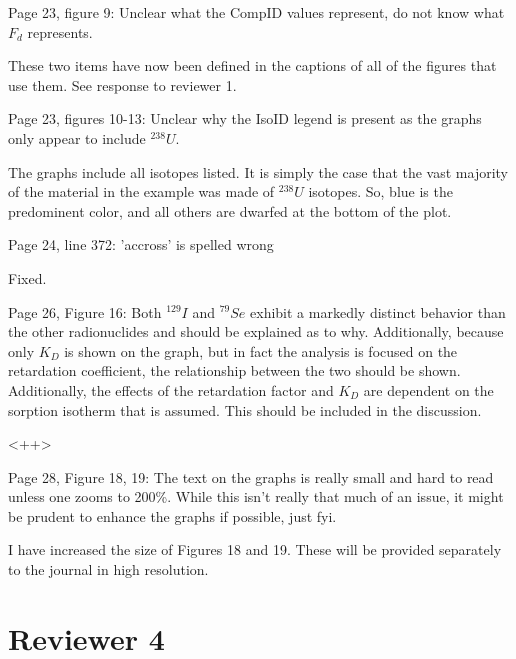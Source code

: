 \documentclass[answers,12pt]{exam}
\begin{document}
\begin{questions}
\question 
Page 23, figure 9: Unclear what the CompID values represent, do not know what $F_d$ represents. 
\begin{solution}
These two items have now been defined in the captions of all of the figures 
        that use them. See response to reviewer 1. 
\end{solution} 
 
\question Page  23,  figures  10-13:  Unclear  why  the  IsoID  legend  is  
present  as  the  graphs  only  appear  to  include  $^{238} U$. 
\begin{solution}
The graphs include all isotopes listed. It is simply the case that the vast 
        majority of the material in the example was made of $^{238}U$ isotopes. 
        So, blue is the predominent color, and all others are dwarfed at the 
        bottom of the plot.
\end{solution} 
 
\question Page 24, line 372: 'accross' is spelled wrong 
\begin{solution}
Fixed.
\end{solution} 
 
\question Page  26,  Figure  16:  Both  $^{129}I$  and  $^{79}Se$  exhibit  a  markedly  distinct  behavior  than  the  other  radionuclides 
and  should  be  explained  as  to  why.  Additionally,  because  only  
$K_D$ is shown on the graph, but in fact the 
analysis  is  focused  on  the  retardation  coefficient,  the  relationship  between  the  two  should  be  shown. 
Additionally,  the  effects  of  the  retardation  factor  and  $K_D$  are dependent on the sorption isotherm that is 
assumed. This should be included in the discussion.  
\begin{solution}
<++>
\end{solution} 
 

\question 
Page 28, Figure 18, 19: The text on the graphs is really small and hard to read unless one zooms to 200\%. 
While  this  isn't  really  that  much  of  an  issue,  it  might  be  prudent  to  enhance  the  graphs  if  possible,  just 
fyi.  
\begin{solution}
I have increased the size of Figures 18 and 19.
        These will be provided separately to the journal in high resolution. 
\end{solution} 

\section*{Reviewer 4}


\end{questions}
\end{document}
